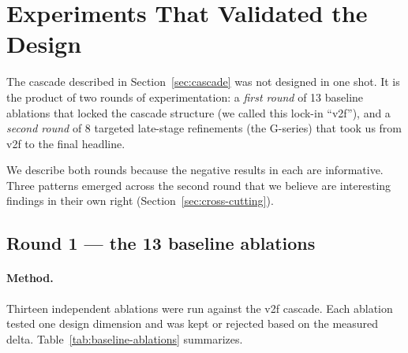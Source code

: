 \section{Experiments That Validated the Design}
\label{sec:experiments}

The cascade described in Section~\ref{sec:cascade} was not designed in one shot. It is the product of two rounds of experimentation: a \emph{first round} of 13 baseline ablations that locked the cascade structure (we called this lock-in ``v2f''), and a \emph{second round} of 8 targeted late-stage refinements (the G-series) that took us from v2f to the final headline.

We describe both rounds because the negative results in each are informative. Three patterns emerged across the second round that we believe are interesting findings in their own right (Section~\ref{sec:cross-cutting}).

\subsection{Round 1 --- the 13 baseline ablations}

\paragraph{Method.} Thirteen independent ablations were run against the v2f cascade. Each ablation tested one design dimension and was kept or rejected based on the measured delta. Table~\ref{tab:baseline-ablations} summarizes.

